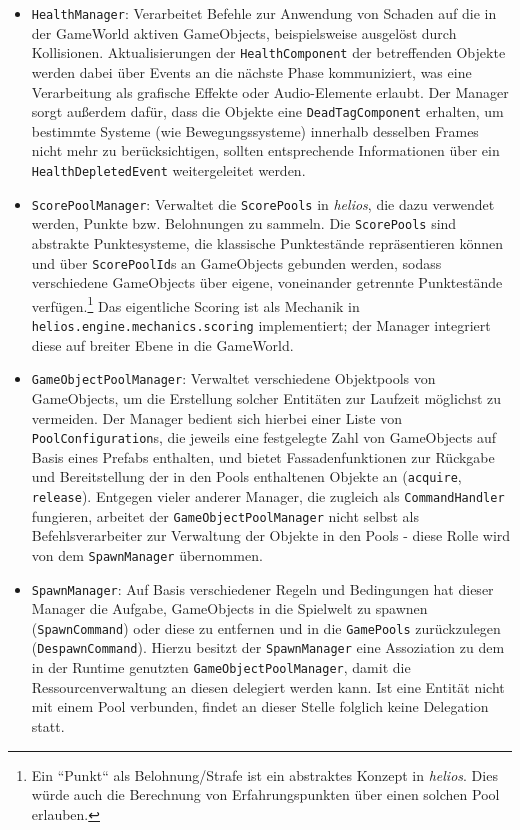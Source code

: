 \begin{itemize}
    \item \texttt{HealthManager}: Verarbeitet Befehle zur Anwendung von Schaden auf die in der GameWorld aktiven GameObjects, beispielsweise ausgelöst durch Kollisionen.
    Aktualisierungen der \texttt{HealthComponent} der betreffenden Objekte werden dabei über Events an die nächste Phase kommuniziert, was eine Verarbeitung als grafische Effekte oder Audio-Elemente erlaubt.
    Der Manager sorgt außerdem dafür, dass die Objekte eine \texttt{DeadTagComponent} erhalten, um bestimmte Systeme (wie Bewegungssysteme) innerhalb desselben Frames nicht mehr zu berücksichtigen, sollten entsprechende Informationen über ein \texttt{HealthDepletedEvent} weitergeleitet werden.

    \item \texttt{ScorePoolManager}: Verwaltet die \texttt{ScorePools} in \textit{helios}, die dazu verwendet werden, Punkte bzw. Belohnungen zu sammeln.
    Die \texttt{ScorePools} sind abstrakte Punktesysteme, die klassische Punktestände repräsentieren können und über \texttt{ScorePoolId}s an GameObjects gebunden werden, sodass verschiedene GameObjects über eigene, voneinander getrennte Punktestände verfügen.\footnote{
        Ein ``Punkt`` als Belohnung/Strafe ist ein abstraktes Konzept in \textit{helios}.
        Dies würde auch die Berechnung von Erfahrungspunkten über einen solchen Pool erlauben.
    }
    Das eigentliche Scoring ist als Mechanik in \texttt{helios.engine.mechanics.scoring} implementiert; der Manager integriert diese auf breiter Ebene in die GameWorld.

    \item \texttt{GameObjectPoolManager}: Verwaltet verschiedene Objektpools von GameObjects, um die Erstellung solcher Entitäten zur Laufzeit möglichst zu vermeiden.
    Der Manager bedient sich hierbei einer Liste von \texttt{PoolConfiguration}s, die jeweils eine festgelegte Zahl von GameObjects auf Basis eines Prefabs enthalten, und bietet Fassadenfunktionen zur Rückgabe und Bereitstellung der in den Pools enthaltenen Objekte an (\texttt{acquire}, \texttt{release}).
    Entgegen vieler anderer Manager, die zugleich als \texttt{CommandHandler} fungieren, arbeitet der \texttt{GameObjectPoolManager} nicht selbst als Befehlsverarbeiter zur Verwaltung der Objekte in den Pools - diese Rolle wird von dem \texttt{SpawnManager} übernommen.

    \item \texttt{SpawnManager}: Auf Basis verschiedener Regeln und Bedingungen hat dieser Manager die Aufgabe, GameObjects in die Spielwelt zu spawnen (\texttt{SpawnCommand}) oder diese zu entfernen und in die \texttt{GamePools} zurückzulegen (\texttt{DespawnCommand}).
    Hierzu besitzt der \texttt{SpawnManager} eine Assoziation zu dem in der Runtime genutzten \texttt{GameObjectPoolManager}, damit die Ressourcenverwaltung an diesen delegiert werden kann.
    Ist eine Entität nicht mit einem Pool verbunden, findet an dieser Stelle folglich keine Delegation statt.


\end{itemize}
